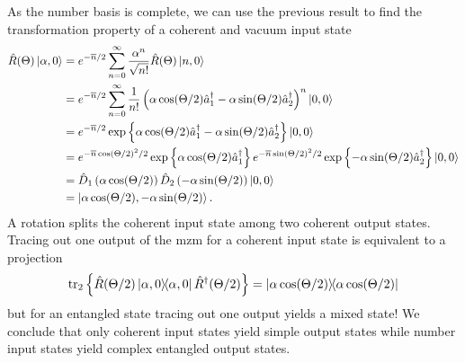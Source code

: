 As the number basis is complete, we can use the previous result to find the transformation property of a coherent and vacuum input state
\begin{equation}
	\begin{split}
		\hat{R}(\Theta)
		\ket{\alpha,0}
		&=
		e^{-\overline{n}/2}
		\sum_{n=0}^\infty
		\frac{\alpha^n}{\sqrt{n!}}
		\hat{R}(\Theta)
		\ket{n,0}
		\\
		&=
		e^{-\overline{n}/2}
		\sum_{n=0}^\infty
		\frac{1}{n!}
		\left(
			\alpha
			\cos(\Theta/2)
			\hat{a}_1^\dagger
			-
			\alpha
			\sin(\Theta/2)
			\hat{a}_2^\dagger
		\right)^n
		\ket{0,0}
		\\
		&=
		e^{-\overline{n}/2}
		\exp\left\{
			\alpha
			\cos(\Theta/2)
			\hat{a}_1^\dagger
			-
			\alpha
			\sin(\Theta/2)
			\hat{a}_2^\dagger
		\right\}
		\ket{0,0}
		\\
		&=
		e^{-\overline{n}\cos(\Theta/2)^2/2}
		\exp\left\{
			\alpha
			\cos(\Theta/2)
			\hat{a}_1^\dagger
		\right\}
		e^{-\overline{n}\sin(\Theta/2)^2/2}
		\exp\left\{
			-
			\alpha
			\sin(\Theta/2)
			\hat{a}_2^\dagger
		\right\}
		\ket{0,0}
		\\
		&=
		\hat{D}_1\left(
			\alpha
			\cos(\Theta/2)
		\right)
		\hat{D}_2\left(
			-
			\alpha
			\sin(\Theta/2)
		\right)
		\ket{0,0}
		\\
		&=
		\ket{\alpha\cos(\Theta/2),-\alpha\sin(\Theta/2)}
		.
	\end{split}
\end{equation}
A rotation splits the coherent input state among two coherent output states.
Tracing out one output of the \gls{mzm} for a coherent input state is equivalent to a projection
\begin{equation}
	\tr_2\left\{
		\hat{R}(\Theta/2)
		\ketbra{\alpha,0}
		\hat{R}^\dagger(\Theta/2)
	\right\}
	=
	\ketbra{\alpha\cos(\Theta/2)}
\end{equation}
but for an entangled state tracing out one output yields a mixed state!
We conclude that only coherent input states yield simple output states while number input states yield complex entangled output states.

